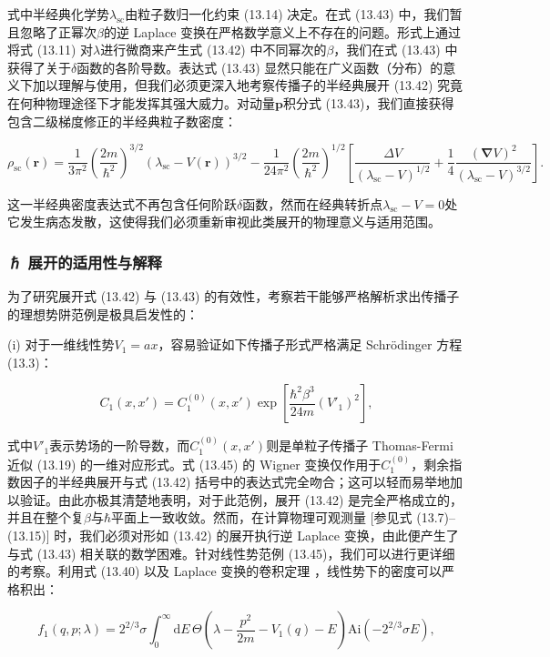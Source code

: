 式中半经典化学势$\lambda_{\mathrm{sc}}$由粒子数归一化约束 (13.14) 决定。在式 (13.43) 中，我们暂且忽略了正幂次$\beta$的逆
Laplace 变换在严格数学意义上不存在的问题。形式上通过将式 (13.11) 对$\lambda$进行微商来产生式 (13.42)
中不同幂次的$\beta$，我们在式 (13.43) 中获得了关于$\delta$函数的各阶导数。表达式 (13.43) 显然只能在广义函数（分布）的意义下加以理解与使用，但我们必须更深入地考察传播子的半经典展开
(13.42) 究竟在何种物理途径下才能发挥其强大威力。对动量$\boldsymbol{p}$积分式 (13.43)，我们直接获得包含二级梯度修正的半经典粒子数密度：

\[
\rho_{\mathrm{sc}}(\boldsymbol{r})=\frac{1}{3\pi^{2}}\left(\frac{2m}{\hbar^{2}}\right)^{3/2}(\lambda_{\mathrm{sc}}-V(\boldsymbol{r}))^{3/2}-\frac{1}{24\pi^{2}}\left(\frac{2m}{\hbar^{2}}\right)^{1/2}\left[\frac{\Delta V}{(\lambda_{\mathrm{sc}}-V)^{1/2}}+\frac{1}{4}\frac{(\boldsymbol{\nabla}V)^{2}}{(\lambda_{\mathrm{sc}}-V)^{3/2}}\right].
\]

这一半经典密度表达式不再包含任何阶跃$\delta$函数，然而在经典转折点$\lambda_{\mathrm{sc}}-V=0$处它发生病态发散，这使得我们必须重新审视此类展开的物理意义与适用范围。

\subsubsection{ℏ 展开的适用性与解释\label{subsubsec:13.2.2.2_=009002=007528=006027=004E0E=0089E3=0091CA}}

为了研究展开式 (13.42) 与 (13.43) 的有效性，考察若干能够严格解析求出传播子的理想势阱范例是极具启发性的：

(i) 对于一维线性势$V_{1}=ax$，容易验证如下传播子形式严格满足 Schrödinger 方程 (13.3)：

\[
C_{1}(x,x')=C^{(0)}_{1}(x,x')\exp\left[\frac{\hbar^{2}\beta^{3}}{24m}(V'_{1})^{2}\right],
\]

式中$V'_{1}$表示势场的一阶导数，而$C^{(0)}_{1}(x,x')$则是单粒子传播子 Thomas-Fermi 近似
(13.19) 的一维对应形式。式 (13.45) 的 Wigner 变换仅作用于$C^{(0)}_{1}$，剩余指数因子的半经典展开与式
(13.42) 括号中的表达式完全吻合；这可以轻而易举地加以验证。由此亦极其清楚地表明，对于此范例，展开 (13.42) 是完全严格成立的，并且在整个复$\beta$与$\hbar$平面上一致收敛。然而，在计算物理可观测量
{[}参见式 (13.7)–(13.15){]} 时，我们必须对形如 (13.42) 的展开执行逆 Laplace 变换，由此便产生了与式
(13.43) 相关联的数学困难。针对线性势范例 (13.45)，我们可以进行更详细的考察。利用式 (13.40) 以及 Laplace
变换的卷积定理 \cite{PB55,AS65}，线性势下的密度可以严格积出：

\[
f_{1}(q,p;\lambda)=2^{2/3}\sigma\int^{\infty}_{0}\mathrm{d}E\,\Theta\left(\lambda-\frac{p^{2}}{2m}-V_{1}(q)-E\right)\mathrm{Ai}\left(-2^{2/3}\sigma E\right),
\]

